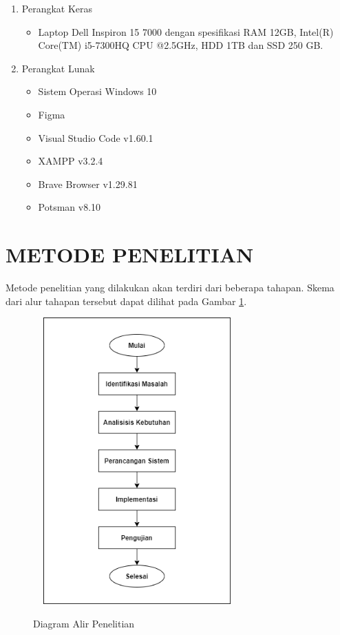 \begin{enumerate}
\item Perangkat Keras
	\begin{itemize}
	\item Laptop Dell Inspiron 15 7000 dengan spesifikasi RAM 12GB, Intel(R) Core(TM) i5-7300HQ CPU @2.5GHz, HDD 1TB dan SSD 250 GB.
	\end{itemize}

\item Perangkat Lunak
	\begin{itemize}
	\item Sistem Operasi Windows 10
	\item Figma
	\item Visual Studio Code v1.60.1
	\item XAMPP v3.2.4
	\item Brave Browser v1.29.81
	\item Potsman v8.10
	\end{itemize}
\end{enumerate}

\section{\uppercase{METODE PENELITIAN}}
Metode penelitian yang dilakukan akan terdiri dari beberapa tahapan. Skema dari alur tahapan tersebut dapat dilihat pada Gambar \ref{alur_penelitian}.

\begin{figure}[H]
\centering
{\includegraphics [width = 8cm, height= 11cm]{gambar/flowchart_proposal}}
\caption{Diagram Alir Penelitian}
\label{alur_penelitian}
\end{figure}

